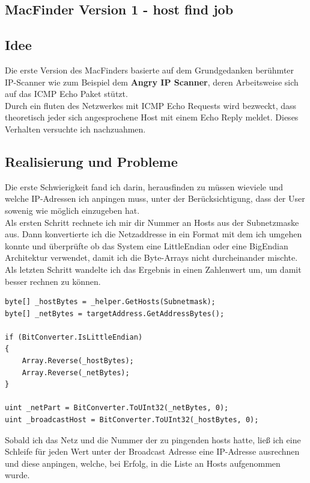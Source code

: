 \documentclass[12pt,a4paper]{report}
\begin{document}
\begin{onehalfspace}
\section{MacFinder Version 1 - host find job}
\subsection{Idee}
Die erste Version des MacFinders basierte auf dem Grundgedanken berühmter IP-Scanner wie zum Beispiel dem \textbf{Angry IP Scanner}, deren Arbeitsweise sich auf das ICMP Echo Paket stützt.\\
Durch ein fluten des Netzwerkes mit ICMP Echo Requests wird bezweckt, dass theoretisch jeder sich angesprochene Host mit einem Echo Reply meldet. Dieses Verhalten versuchte ich nachzuahmen.\\

\subsection{Realisierung und Probleme}
Die erste Schwierigkeit fand ich darin, herausfinden zu müssen wieviele und welche IP-Adressen ich anpingen muss, unter der Berücksichtigung, dass der User sowenig wie möglich einzugeben hat.\\
Als ersten Schritt rechnete ich mir dir Nummer an Hosts aus der Subnetzmaske aus. Dann konvertierte ich die Netzaddresse in ein Format mit dem ich umgehen konnte und überprüfte ob das System eine LittleEndian oder eine BigEndian Architektur verwendet, damit ich die Byte-Arrays nicht durcheinander mischte.\\
Als letzten Schritt wandelte ich das Ergebnis in einen Zahlenwert um, um damit besser rechnen zu können.
\begin{lstlisting}
byte[] _hostBytes = _helper.GetHosts(Subnetmask);
byte[] _netBytes = targetAddress.GetAddressBytes();

if (BitConverter.IsLittleEndian)
{
	Array.Reverse(_hostBytes);
    Array.Reverse(_netBytes);
}

uint _netPart = BitConverter.ToUInt32(_netBytes, 0);
uint _broadcastHost = BitConverter.ToUInt32(_hostBytes, 0);
\end{lstlisting}

Sobald ich das Netz und die Nummer der zu pingenden hosts hatte, ließ ich eine Schleife für jeden Wert unter der Broadcast Adresse eine IP-Adresse ausrechnen und diese anpingen, welche, bei Erfolg, in die Liste an Hosts aufgenommen wurde.


\end{onehalfspace}
\end{document}
